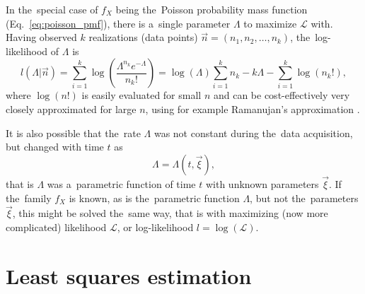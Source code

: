In the~special case of $f_X$ being the~Poisson probability mass function (Eq.~\ref{eq:poisson_pmf}), there is a~single parameter $\Lambda$ to maximize $\mathcal{L}$ with. Having observed $k$ realizations (data points) $\vec{n} = (n_1, n_2, \dots , n_k)$, the~log-likelihood of $\Lambda$ is
\begin{equation}
    l(\Lambda|\vec{n}) = \sum_{i=1}^k \log \left( \frac{\Lambda^{n_k} e^{-\Lambda}}{n_k!} \right) = \log(\Lambda) \sum_{i=1}^k n_k - k \Lambda - \sum_{i=1}^k \log(n_k!),  
\end{equation}
where $\log(n!)$ is easily evaluated for small $n$ and can be cost-effectively very closely approximated for large $n$, using for example Ramanujan's approximation \citep{ramanujan1988lost}. 

It is also possible that the~rate $\Lambda$ was not constant during the~data acquisition, but changed with time $t$ as
\begin{equation}
    \Lambda = \Lambda(t,\vec{\xi}), \label{eq:compound_model}
\end{equation}
that is $\Lambda$ was a~parametric function of time $t$ with unknown parameters $\vec{\xi}$. If the~family $f_X$ is known, as is the~parametric function $\Lambda$, but not the~parameters $\vec{\xi}$, this might be solved the~same way, that is with maximizing (now more complicated) likelihood $\mathcal{L}$, or log-likelihood $l = \log(\mathcal{L})$. 

\section{Least squares estimation}

